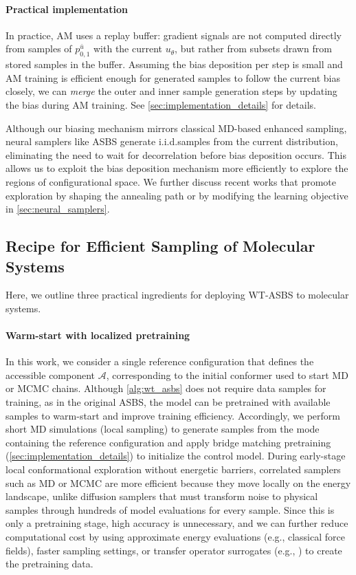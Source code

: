 \documentclass[]{fairmeta}
\theoremstyle{remark}
\begin{document}
\paragraph{Practical implementation}
In practice, AM uses a replay buffer: gradient signals are not computed directly from samples of $p_{0,1}^{\bar{u}}$ with the current $u_\theta$, but rather from subsets drawn from stored samples in the buffer.
Assuming the bias deposition per step is small and AM training is efficient enough for generated samples to follow the current bias closely, we can \textit{merge} the outer and inner sample generation steps by updating the bias during AM training.
See \cref{sec:implementation_details} for details.

Although our biasing mechanism mirrors classical MD-based enhanced sampling, neural samplers like ASBS generate i.i.d.\@ samples from the current distribution, eliminating the need to wait for decorrelation before bias deposition occurs.
This allows us to exploit the bias deposition mechanism more efficiently to explore the regions of configurational space.
We further discuss recent works that promote exploration by shaping the annealing path or by modifying the learning objective in \cref{sec:neural_samplers}.

\subsection{Recipe for Efficient Sampling of Molecular Systems}
\label{sec:recipe}

Here, we outline three practical ingredients for deploying WT-ASBS to molecular systems.
 
\paragraph{Warm-start with localized pretraining}
In this work, we consider a single reference configuration that defines the accessible component $\mathcal{A}$, corresponding to the initial conformer used to start MD or MCMC chains.
Although \cref{alg:wt_asbs} does not require data samples for training, as in the original ASBS, the model can be pretrained with available samples to warm-start and improve training efficiency.
Accordingly, we perform short MD simulations (local sampling) to generate samples from the mode containing the reference configuration and apply bridge matching pretraining (\cref{sec:implementation_details}) to initialize the control model.
During early-stage local conformational exploration without energetic barriers, correlated samplers such as MD or MCMC are more efficient because they move locally on the energy landscape, unlike diffusion samplers that must transform noise to physical samples through hundreds of model evaluations for every sample.
Since this is only a pretraining stage, high accuracy is unnecessary, and we can further reduce computational cost by using approximate energy evaluations (e.g., classical force fields), faster sampling settings, or transfer operator surrogates (e.g., \citealp{schreiner2024implicit}) to create the pretraining data.
\end{document}
